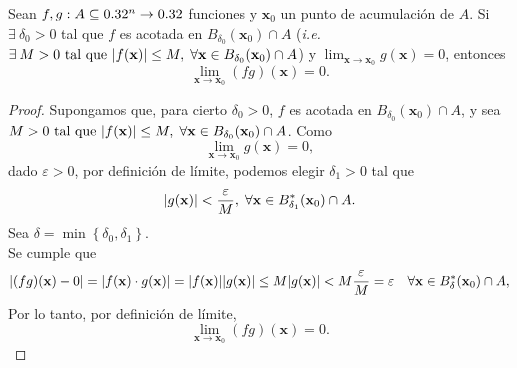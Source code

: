 \begin{propertie} \label{prop:cero_x_acotada}
 Sean $f, g : A  \subseteq  0.32^n \to 0.32$ funciones y $\mathbf{x}_0$ un punto de acumulaci\'on de $A$. Si $\exists\: \delta_0 > 0$ tal que $f$ es acotada en $B_{\delta_0}(\mathbf{x}_0) \cap A$ (\textit{i.e.} $\exists\: M > 0 \text{ tal que } \abs{f(\mathbf{x})} \le M,\;\forall \mathbf{x} \in  B_{\delta_0}(\mathbf{x}_0) \cap A$) y $\lim_{\mathbf{x} \to \mathbf{x}_0}g(\mathbf{x}) = 0$, entonces
\[
 \lim_{\mathbf{x} \to \mathbf{x}_0}(f  g)(\mathbf{x}) = 0.
\]
\begin{proof} Supongamos que, para cierto $\delta_0 > 0$, $f$ es acotada en $B_{\delta_0}(\mathbf{x}_0) \cap A$, y sea $M > 0 \text{ tal que } \abs{f(\mathbf{x})} \le M, \; \forall \mathbf{x} \in  B_{\delta_0}(\mathbf{x}_0) \cap A$.
Como 
\[
\lim_{\mathbf{x} \to \mathbf{x}_0}g(\mathbf{x}) = 0, 
\]
dado $\varepsilon > 0 $, por definici\'on de l\'imite, podemos elegir $\delta_1 > 0$ tal que 
\[
 \abs{g(\mathbf{x})} < \frac{\varepsilon}{M},\;\forall \mathbf{x} \in  B^*_{\delta_1}(\mathbf{x}_0) \cap A.                                                                                               
\]
Sea $\delta = \min{ \left\{ \delta_0, \delta_1 \right\} }$. \\
Se cumple que
\[
 \abs{ (fg)(\mathbf{x}) - 0 } = \abs{ f(\mathbf{x}) \cdot g(\mathbf{x}) } = \abs{f(\mathbf{x})}\abs{g(\mathbf{x})} \le 
 M \abs{g(\mathbf{x})} < M \frac{\varepsilon}{M} = \varepsilon \quad \forall \mathbf{x} \in  B^*_{\delta}(\mathbf{x}_0) \cap A,
\]
Por lo tanto, por definici\'on de l\'imite,
\[
 \lim_{\mathbf{x} \to \mathbf{x}_0}(fg)(\mathbf{x}) = 0.
\]\end{proof}
\end{propertie}


